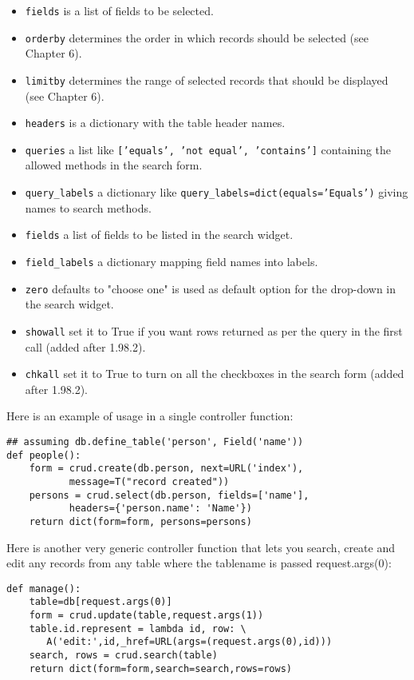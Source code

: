 \documentclass[justified,sixbynine,notoc]{tufte-book}
\def\ft{\small\tt}
\begin{document}
\begin{fullwidth}
\begin{itemize}
\item {\ft fields} is a list of fields to be selected.

\item {\ft orderby} determines the order in which records should be selected (see Chapter 6).

\item {\ft limitby} determines the range of selected records that should be displayed (see Chapter 6).

\item {\ft headers} is a dictionary with the table header names.

\item {\ft queries} a list like {\ft ['equals', 'not equal', 'contains']} containing the allowed methods in the search form.

\item {\ft query\_labels} a dictionary like {\ft query\_labels=dict(equals='Equals')} giving names to search methods.

\item {\ft fields} a list of fields to be listed in the search widget.

\item {\ft field\_labels} a dictionary mapping field names into labels.

\item {\ft zero} defaults to "choose one" is used as default option for the drop-down in the search widget.

\item {\ft showall} set it to True if you want rows returned as per the query in the first call (added after 1.98.2).

\item {\ft chkall} set it to True to turn on all the checkboxes in the search form (added after 1.98.2).
\end{itemize}

Here is an example of usage in a single controller function:
\begin{lstlisting}
## assuming db.define_table('person', Field('name'))
def people():
    form = crud.create(db.person, next=URL('index'),
           message=T("record created"))
    persons = crud.select(db.person, fields=['name'],
           headers={'person.name': 'Name'})
    return dict(form=form, persons=persons)
\end{lstlisting}

Here is another very generic controller function that lets you search, create and edit any records from any table where the tablename is passed request.args(0):
\begin{lstlisting}
def manage():
    table=db[request.args(0)]
    form = crud.update(table,request.args(1))
    table.id.represent = lambda id, row: \
       A('edit:',id,_href=URL(args=(request.args(0),id)))
    search, rows = crud.search(table)
    return dict(form=form,search=search,rows=rows)
\end{lstlisting}


\end{fullwidth}
\end{document}
